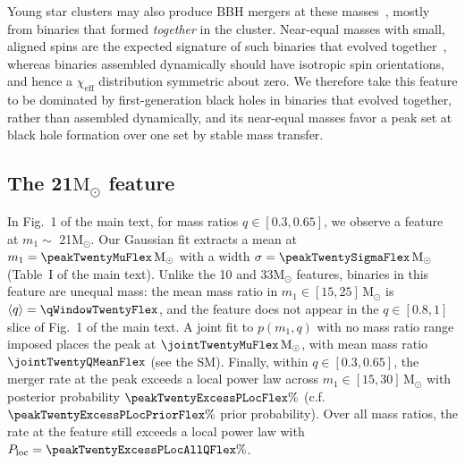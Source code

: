 \documentclass[%
 onecolumn,
 amsmath,amssymb,
 aps,
 prl,
 nofootinbib,nobibnotes,
]{revtex4-2}
\newcommand{\Msun}{\ensuremath{\mathrm{M}_{\odot}}}
\newcommand{\chieff}{\ensuremath{\chi_{\mathrm{eff}}}}
\newcommand{\featTen}{10\xspace}
\newcommand{\featTwenty}{21\xspace}
\newcommand{\featThirtyFive}{33\xspace}
\begin{document}
Young star clusters may also produce \ac{BBH} mergers at these masses~\cite{DiCarlo:2019pmf, Santoliquido:2020bry, Mapelli:2021gyv}, mostly from binaries that formed \textit{together} in the cluster. Near-equal masses with small, aligned spins are the expected signature of such binaries that evolved together~\cite{Zaldarriaga:2017qkw, Qin:2018vaa, Fuller:2019sxi, Bavera:2020inc, Zevin:2022wrw}, whereas binaries assembled dynamically should have isotropic spin orientations, and hence a $\chieff$ distribution symmetric about zero. We therefore take this feature to be dominated by first-generation black holes in binaries that evolved together, rather than assembled dynamically, and its near-equal masses favor a peak set at black hole formation over one set by stable mass transfer.

\subsection{The \featTwenty $\Msun$ feature}

In Fig.~1 of the main text, for mass ratios $q \in [0.3, 0.65]$, we observe a feature at $m_1\sim$ \featTwenty $\Msun$. Our Gaussian fit extracts a mean at $m_1 = \peakTwentyMuFlex\,\Msun$ with a width $\sigma = \peakTwentySigmaFlex\,\Msun$ (Table~I of the main text). Unlike the \featTen and \featThirtyFive $\Msun$ features, binaries in this feature are unequal mass: the mean mass ratio in $m_1 \in [15, 25]\,\Msun$ is $\langle q \rangle = \qWindowTwentyFlex$, and the feature does not appear in the $q \in [0.8, 1]$ slice of Fig.~1 of the main text. A joint fit to $p(m_1, q)$ with no mass ratio range imposed places the peak at $\jointTwentyMuFlex\,\Msun$, with mean mass ratio $\jointTwentyQMeanFlex$ (see the SM). Finally, within $q \in [0.3, 0.65]$, the merger rate at the peak exceeds a local power law across $m_1 \in [15, 30]\,\Msun$ with posterior probability $\peakTwentyExcessPLocFlex\%$ (c.f. $\peakTwentyExcessPLocPriorFlex\%$ prior probability). Over all mass ratios, the rate at the feature still exceeds a local power law with $P_{\rm loc} = \peakTwentyExcessPLocAllQFlex\%$.
\end{document}
